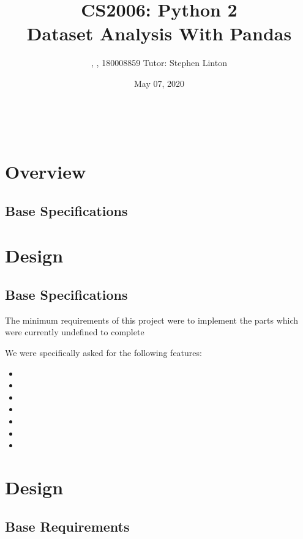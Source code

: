 \documentclass[12pt,a4paper,final]{article}
\begin{document}
\title{%
    CS2006: Python 2 \\
    \Large Dataset Analysis With Pandas} \\
\author{, , 180008859 Tutor: Stephen Linton}
\date{May 07, 2020}
\maketitle

\section*{Overview}

\subsection*{Base Specifications}

\begin{itemize}[noitemsep]

\end{itemize}

\section*{Design}

\subsection*{Base Specifications}

The minimum requirements of this project were to implement the parts which were currently undefined
to complete

We were specifically asked for the following features:

\begin{itemize}[noitemsep]
	\item
    \item
    \item
    \item
    \item
    \item
    \item
\end{itemize}

\section*{Design}

\subsection*{Base Requirements}
\end{document}
